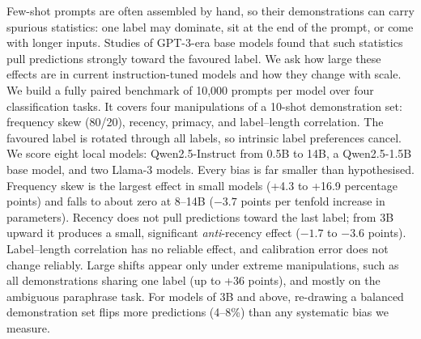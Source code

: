 Few-shot prompts are often assembled by hand, so their demonstrations can carry spurious statistics: one label may dominate, sit at the end of the prompt, or come with longer inputs. Studies of GPT-3-era base models found that such statistics pull predictions strongly toward the favoured label. We ask how large these effects are in current instruction-tuned models and how they change with scale. We build a fully paired benchmark of 10,000 prompts per model over four classification tasks. It covers four manipulations of a 10-shot demonstration set: frequency skew (80/20), recency, primacy, and label--length correlation. The favoured label is rotated through all labels, so intrinsic label preferences cancel. We score eight local models: Qwen2.5-Instruct from 0.5B to 14B, a Qwen2.5-1.5B base model, and two Llama-3 models. Every bias is far smaller than hypothesised. Frequency skew is the largest effect in small models (+4.3 to +16.9 percentage points) and falls to about zero at 8--14B ($-3.7$ points per tenfold increase in parameters). Recency does not pull predictions toward the last label; from 3B upward it produces a small, significant \emph{anti}-recency effect ($-1.7$ to $-3.6$ points). Label--length correlation has no reliable effect, and calibration error does not change reliably. Large shifts appear only under extreme manipulations, such as all demonstrations sharing one label (up to +36 points), and mostly on the ambiguous paraphrase task. For models of 3B and above, re-drawing a balanced demonstration set flips more predictions (4--8\%) than any systematic bias we measure.
